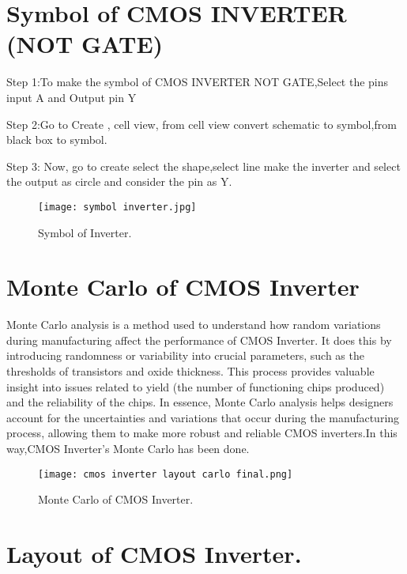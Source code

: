 \documentclass[conference]{IEEEtran}
\begin{document}
\section{Symbol of CMOS INVERTER (NOT GATE)}

Step 1:To make the symbol of CMOS INVERTER NOT GATE,Select the pins input A and Output pin Y

Step 2:Go to Create , cell view, from cell view convert schematic to symbol,from black box to symbol.

Step 3: Now, go to create select the shape,select line make the inverter and select the output as circle and consider the pin as Y.


\begin{figure}[h] %
    \centering
    \texttt{[image: symbol inverter.jpg]} %
    \caption{Symbol of Inverter.} %
     
\end{figure}


\section{Monte Carlo of CMOS Inverter}
Monte Carlo analysis is a method used to understand how
random variations during manufacturing affect the performance of CMOS Inverter. It does this by introducing randomness or variability into crucial parameters, such as the
thresholds of transistors and oxide thickness. This process
provides valuable insight into issues related to yield (the
number of functioning chips produced) and the reliability of
the chips. In essence, Monte Carlo analysis helps designers
account for the uncertainties and variations that occur during
the manufacturing process, allowing them to make more robust
and reliable CMOS inverters.In this way,CMOS Inverter's Monte Carlo has been done.
 
 
 
 \begin{figure}[h] %
    \centering
    \texttt{[image: cmos inverter layout carlo final.png]} %
    \caption{Monte Carlo of CMOS Inverter.} %
     
\end{figure}

 \section{Layout of CMOS Inverter.}
\end{document}
